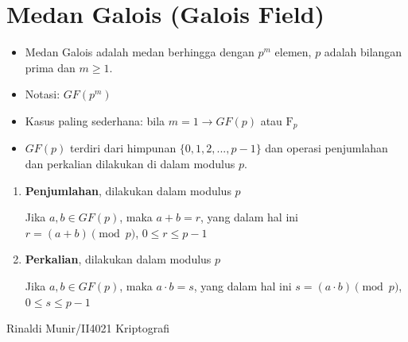 \documentclass{article}
\begin{document}

\section*{Medan Galois (Galois Field)}

\begin{itemize}
    \item Medan Galois adalah medan berhingga dengan $p^m$ elemen, $p$ adalah bilangan prima dan $m \ge 1$.
    \item Notasi: $GF(p^m)$
    \item Kasus paling sederhana: bila $m = 1 \rightarrow GF(p)$ atau $\text{F}_p$
    \item $GF(p)$ terdiri dari himpunan $\{0, 1, 2, ..., p-1\}$ dan operasi penjumlahan dan perkalian dilakukan di dalam modulus $p$.
\end{itemize}

\begin{enumerate}
    \item \textbf{Penjumlahan}, dilakukan dalam modulus $p$
    
    Jika $a, b \in GF(p)$, maka $a + b = r$, yang dalam hal ini $r = (a + b) \pmod p$, $0 \le r \le p - 1$
    
    \item \textbf{Perkalian}, dilakukan dalam modulus $p$
    
    Jika $a, b \in GF(p)$, maka $a \cdot b = s$, yang dalam hal ini $s = (a \cdot b) \pmod p$, $0 \le s \le p - 1$
\end{enumerate}

\vspace{10mm}

\centering Rinaldi Munir/II4021 Kriptografi
\end{document}
